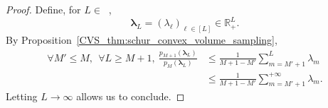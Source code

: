 \documentclass[twoside,11pt]{book}
\numberwithin{theorem}{chapter}
\numberwithin{definition}{chapter}
\numberwithin{proposition}{chapter}
\numberwithin{corollary}{chapter}
\numberwithin{example}{chapter}
\numberwithin{lemma}{chapter}
\numberwithin{assumption}{chapter}
\DeclareMathOperator{\Ns}{\mathbb{N}^{*}}
\newcommand{\pc}[1]{\textcolor{blue}{#1}}
\begin{document}
\begin{proof}
Define, for $L \in \Ns$,
\begin{equation}
\bm{\lambda}_{L} = (\lambda_{\ell})_{\ell \in [L]} \in \mathbb{R}_{+}^{L}.
\end{equation}
%
By Proposition~\ref{CVS_thm:schur_convex_volume_sampling},
\begin{align}\label{CVS_eq:ineq_lambda_L}
\forall M' \leq M, \:\: \forall L \geq M+1, \: \frac{p_{M+1}(\bm{\lambda}_{L})}{p_{M}(\bm{\lambda}_{L})} & \leq \frac{1}{M+1-M'}\sum\limits_{m = M'+1}^{L} \lambda_{m}\\
& \leq \frac{1}{M+1-M'}\sum\limits_{m = M'+1}^{+\infty} \lambda_{m}.
\end{align}
Letting $L\rightarrow \infty$ allows us to conclude.
\end{proof}
\end{document}
